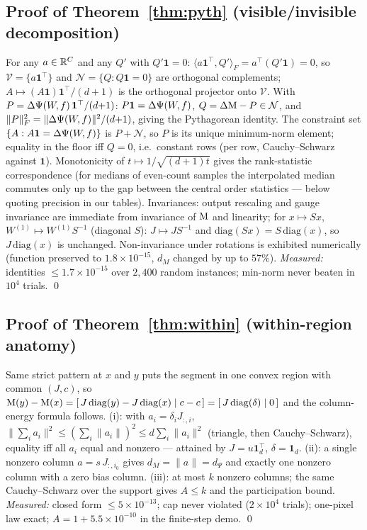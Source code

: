 \subsection{Proof of Theorem~\ref{thm:pyth} (visible/invisible decomposition)}

For any $a\in\mathbb{R}^C$ and any $Q'$ with $Q'\mathbf 1=0$:
$\langle a\mathbf 1^{\top},Q'\rangle_F=a^{\top}(Q'\mathbf 1)=0$, so
$\mathcal V=\{a\mathbf 1^{\top}\}$ and $\mathcal N=\{Q:Q\mathbf 1=0\}$ are
orthogonal complements; $A\mapsto(A\mathbf 1)\mathbf 1^{\top}/(d{+}1)$ is the
orthogonal projector onto $\mathcal V$. With
$P=\Delta\Psi(W\!,f)\,\mathbf 1^{\top}/(d{+}1)$:
$P\mathbf 1=\Delta\Psi(W\!,f)$, $Q=\Delta\mathrm{M}-P\in\mathcal N$, and
$\|P\|_F^2=\|\Delta\Psi(W\!,f)\|^2/(d{+}1)$, giving the Pythagorean identity. The
constraint set $\{A:A\mathbf 1=\Delta\Psi(W\!,f)\}$ is $P+\mathcal N$, so $P$ is its
unique minimum-norm element; equality in the floor iff $Q=0$, i.e.\ constant
rows (per row, Cauchy--Schwarz against $\mathbf 1$). Monotonicity of
$t\mapsto1/\sqrt{(d{+}1)t}$ gives the rank-statistic correspondence (for
medians of even-count samples the interpolated median commutes only up to the
gap between the central order statistics --- below quoting precision in our
tables). Invariances: output rescaling and gauge invariance are immediate from
invariance of $\mathrm{M}$ and linearity; for $x\mapsto Sx$,
$W^{(1)}\mapsto W^{(1)}S^{-1}$ (diagonal $S$): $J\mapsto JS^{-1}$ and
$\mathrm{diag}(Sx)=S\,\mathrm{diag}(x)$, so $J\,\mathrm{diag}(x)$ is
unchanged. Non-invariance under rotations is exhibited numerically (function
preserved to $1.8\times10^{-15}$, $d_M$ changed by up to $57\%$).
\emph{Measured:} identities $\le1.7\times10^{-15}$ over $2{,}400$ random
instances; min-norm never beaten in $10^4$ trials. \qed

\subsection{Proof of Theorem~\ref{thm:within} (within-region anatomy)}

Same strict pattern at $x$ and $y$ puts the segment in one convex region with
common $(J,c)$, so $\mathrm{M}(y)-\mathrm{M}(x)=[\,J\,\mathrm{diag}(y)-J\,\mathrm{diag}(x)
\mid c-c\,]=[\,J\,\mathrm{diag}(\delta)\mid0\,]$ and the column-energy formula
follows. (i): with $a_i=\delta_iJ_{:,i}$,
$\|\sum_ia_i\|^2\le(\sum_i\|a_i\|)^2\le d\sum_i\|a_i\|^2$ (triangle, then
Cauchy--Schwarz), equality iff all $a_i$ equal and nonzero --- attained by
$J=u\mathbf 1_d^{\top}$, $\delta=\mathbf 1_d$. (ii): a single nonzero column
$a=s\,J_{:,i_0}$ gives $d_M=\|a\|=d_\Psi$ and exactly one nonzero column with a
zero bias column. (iii): at most $k$ nonzero columns; the same
Cauchy--Schwarz over the support gives $A\le k$ and the participation bound.
\emph{Measured:} closed form $\le5\times10^{-13}$; cap never violated
($2\times10^4$ trials); one-pixel law exact; $A=1+5.5\times10^{-10}$ in the
finite-step demo. \qed

